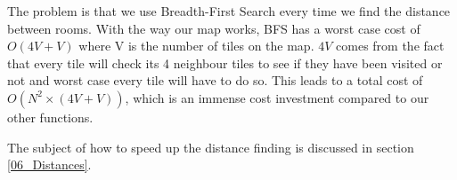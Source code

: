 The problem is that we use Breadth-First Search\cite{sedgewick4th}\cite{ucibfs} every time we find the distance between rooms. With the way our map works, BFS has a worst case cost of $O(4V + V)$ where V is the number of tiles on the map. $4V$ comes from the fact that every tile will check its 4 neighbour tiles to see if they have been visited or not and worst case every tile will have to do so. This leads to a total cost of $O(N^2 \times (4V + V))$, which is an immense cost investment compared to our other functions.

The subject of how to speed up the distance finding is discussed in section \ref{06_Distances}.






